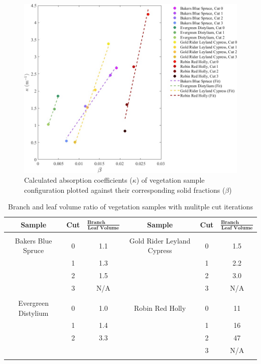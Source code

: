 \documentclass[12pt]{article}
\newcommand*\textfrac[2]{
  \frac{{#1}}{{#2}}
}
\begin{document}
\begin{figure}[!h]
	\centering 	
    \includegraphics[width=1\linewidth]{Picture12.jpg}
	\caption[Comparison of absorption coefficient, $\kappa$, and solid fraction, $\beta$]{Calculated absorption coefficients ($\kappa$) of vegetation sample configuration plotted against their corresponding solid fractions ($\beta$)}
	\label{fig:betavkappa}
\end{figure}



\begin{table}[!h]
\caption[Branch and leaf volume ratio of vegetation samples]{Branch and leaf volume ratio of vegetation samples with mulitple cut iterations}
\label{tab:RatioTable}
\centering
	
	\begin{tabular}{cccccc}	
			\hline
\rule{0pt}{14pt}\textbf{Sample}	&\textbf{Cut}	& $\textfrac{\textbf{Branch Volume}}{\textbf{Leaf Volume}}$	&\textbf{Sample}			&	\textbf{Cut}	& $\textfrac{\textbf{Branch Volume}}{\textbf{Leaf Volume}}$	\\
\hline
\\[0.01cm]
Bakers Blue Spruce			&	0		&        1.1							&Gold Rider Leyland Cypress	&	0		&	1.5						\\
					&	1		& 	1.3							&					&	1		&	2.2						\\
					&	2		& 	1.5							&					&	2		&	3.0						\\
					&	3		&	N/A							&					&	3		&  	N/A 						\\
					&			&								&					&			&       							\\
Evergreen Distylium			&	0		&	1.0							&Robin Red Holly			&	0		&	11						\\
					&	1		&	1.4							&					&	1		&	16						\\
					&	2		&	3.3							&					&	2		&	47						\\
					&			&								&					&	3		&        N/A 						\\
\\[0.005cm]
\hline														

\end{tabular}
\end{table}
\end{document}
